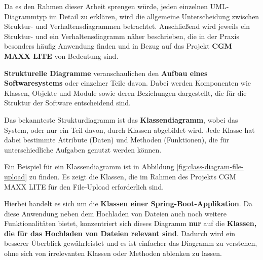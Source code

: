     \clearpage

    Da es den Rahmen dieser Arbeit sprengen würde, jeden einzelnen UML-Diagrammtyp im Detail zu erklären, wird die allgemeine Unterscheidung zwischen Struktur- und Verhaltensdiagrammen betrachtet. Anschließend wird jeweils ein Struktur- und ein Verhaltensdiagramm näher beschrieben, die in der Praxis besonders häufig Anwendung finden und in Bezug auf das Projekt \textbf{CGM MAXX LITE} von Bedeutung sind.



    \textbf{Strukturelle Diagramme} veranschaulichen den \textbf{Aufbau eines Softwaresystems} oder einzelner Teile davon. 
    Dabei werden Komponenten wie Klassen, Objekte und Module sowie deren Beziehungen dargestellt, die für die Struktur der Software entscheidend sind.



        Das bekannteste Strukturdiagramm ist das \textbf{Klassendiagramm}, wobei das System, oder nur ein Teil davon, durch Klassen abgebildet wird.
        Jede Klasse hat dabei bestimmte Attribute (Daten) und Methoden (Funktionen), die für unterschiedliche Aufgaben genutzt werden können.
        \cite{EA:Web17, EA:Web18}
    
        Ein Beispiel für ein Klassendiagramm ist in Abbildung \ref{fig:class-diagram-file-upload} zu finden.
        Es zeigt die Klassen, die im Rahmen des Projekts CGM MAXX LITE für den File-Upload erforderlich sind.
    
        Hierbei handelt es sich um die \textbf{Klassen einer Spring-Boot-Applikation}. Da diese Anwendung neben dem Hochladen von Dateien auch noch weitere Funktionalitäten bietet, konzentriert sich dieses Diagramm \textbf{nur} auf die \textbf{Klassen, die für das Hochladen von Dateien relevant sind}. 
        Dadurch wird ein besserer Überblick gewährleistet und es ist einfacher das Diagramm zu verstehen, ohne sich von irrelevanten Klassen oder Methoden ablenken zu lassen.
    
